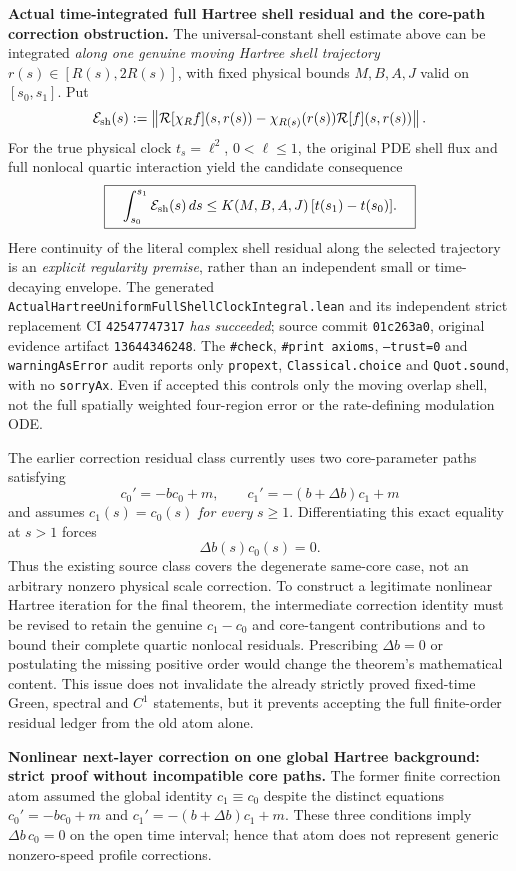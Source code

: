 \documentclass[11pt]{amsart}
\begin{document}
\medskip
\noindent\textbf{Actual time-integrated full Hartree shell residual and
the core-path correction obstruction.}
The universal-constant shell estimate above can be integrated
\emph{along one genuine moving Hartree shell trajectory}
$r(s)\in[R(s),2R(s)]$, with fixed physical bounds
$M,B,A,J$ valid on $[s_0,s_1]$.  Put
\[
 \mathcal E_{\rm sh}(s):=
 \left\|
 \mathcal R[\chi_{R}f](s,r(s))-
 \chi_{R(s)}(r(s))\mathcal R[f](s,r(s))
 \right\|.
\]
For the true physical clock $t_s=\ell^2$, $0<\ell\le1$,
the original PDE shell flux and full nonlocal quartic
interaction yield the candidate consequence
\[
 \boxed{\quad
 \int_{s_0}^{s_1}\mathcal E_{\rm sh}(s)\,ds
 \le K(M,B,A,J)\,[t(s_1)-t(s_0)].
 \quad}
\]
Here continuity of the literal complex shell residual along
the selected trajectory is an \emph{explicit regularity
premise}, rather than an independent small or
time-decaying envelope.  The generated
\texttt{ActualHartreeUniformFullShellClockIntegral.lean}
and its independent strict replacement CI \texttt{42547747317}
\emph{has succeeded}; source commit \texttt{01c263a0},
original evidence artifact \texttt{13644346248}.
The \texttt{\#check}, \texttt{\#print axioms},
\texttt{--trust=0} and \texttt{warningAsError}
audit reports only \texttt{propext},
\texttt{Classical.choice} and \texttt{Quot.sound},
with no \texttt{sorryAx}.  Even if accepted this controls only
the moving overlap shell, not the full spatially weighted
four-region error or the rate-defining modulation ODE.

The earlier correction residual class currently uses two
core-parameter paths satisfying
\[
 c_0'=-bc_0+m,\qquad
 c_1'=-(b+\Delta b)c_1+m
\]
and assumes $c_1(s)=c_0(s)$ \emph{for every} $s\ge1$.
Differentiating this exact equality at $s>1$ forces
\[
 \boxed{\qquad \Delta b(s)c_0(s)=0.\qquad}
\]
Thus the existing source class covers the degenerate
same-core case, not an arbitrary nonzero physical scale
correction.  To construct a legitimate nonlinear Hartree
iteration for the final theorem, the intermediate correction
identity must be revised to retain the genuine
$c_1-c_0$ and core-tangent contributions and to bound
their complete quartic nonlocal residuals.  Prescribing
$\Delta b=0$ or postulating the missing positive order
would change the theorem's mathematical content.
This issue does not invalidate the already strictly
proved fixed-time Green, spectral and $C^1$ statements,
but it prevents accepting the full finite-order
residual ledger from the old atom alone.



\medskip
\noindent\textbf{Nonlinear next-layer correction on one global Hartree background:
strict proof without incompatible core paths.}
The former finite correction atom assumed the global identity
$c_1\equiv c_0$ despite the distinct equations
$c_0'=-bc_0+m$ and $c_1'=-(b+\Delta b)c_1+m$.
These three conditions imply $\Delta b\,c_0=0$ on the open
time interval; hence that atom does not represent generic
nonzero-speed profile corrections.
\end{document}
